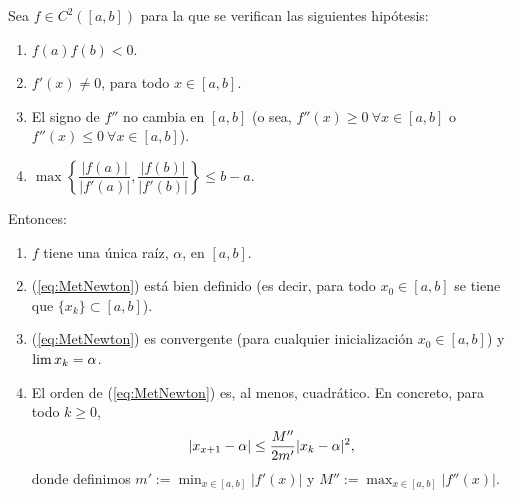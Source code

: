 
\begin{theorem}
  Sea $f\in C^2([a,b])$ para la que se verifican las siguientes
  hipótesis:
  \begin{enumerate}[label=($N_{\arabic*}$)]
  \item $f(a)f(b)<0$.
    \label{item:Newton.H1}
  \item  $f'(x)\neq 0$, para todo $x \in [a,b]$.
    \label{item:Newton.H2}
  \item
    El signo de $f''$ no cambia en $[a,b]$ (o sea,
    $f''(x)\ge 0 \ \forall x\in [a,b]$ o $f''(x)\le 0 \ \forall x\in [a,b]$).
    \label{item:Newton.H3}
  \item
    $\max\left\{ \dfrac{|f(a)|}{|f'(a)|}, \dfrac{|f(b)|}{|f'(b)|}
    \right\} \le b-a.$
    \label{item:Newton:H4}
  \end{enumerate}
  Entonces:
  \begin{enumerate}
  \item $f$ tiene una única raíz, $\alpha$, en $[a,b]$.
  \item (\ref{eq:MetNewton}) está bien definido (es decir, para todo
    $x_0\in [a,b]$ se tiene que $\{x_k\} \subset [a,b]$).
  \item (\ref{eq:MetNewton}) es convergente (para cualquier
    inicialización $x_0\in [a,b]$) y $\lim x_k = \alpha$.
  \item El orden de (\ref{eq:MetNewton}) es, al menos, cuadrático. En
    concreto, para todo $k\ge 0$,
    \begin{equation}
      |x_{x+1} - \alpha| \le \frac {M''}{2m'} |x_k-\alpha|^2,
      \label{eq:Newton.orden.2}
    \end{equation}
    donde definimos $m':=\min_{x\in[a,b]} |f'(x)|$ y $M'':=\max_{x\in[a,b]}|f''(x)|$.
  \end{enumerate}
  \label{thm:Newton.convergencia.global}
\end{theorem}

